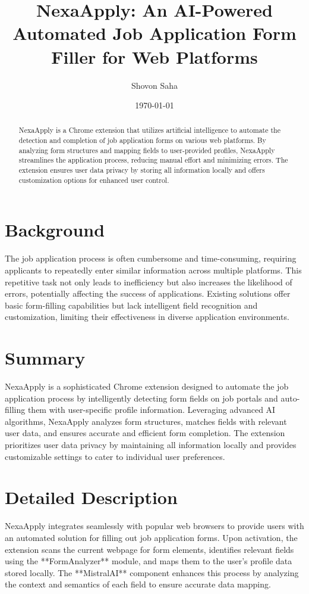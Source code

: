 \documentclass{article}
\title{NexaApply: An AI-Powered Automated Job Application Form Filler for Web Platforms}
\author{Shovon Saha}
\date{\today}
\begin{document}
\maketitle

\begin{abstract}
NexaApply is a Chrome extension that utilizes artificial intelligence to automate the detection and completion of job application forms on various web platforms. By analyzing form structures and mapping fields to user-provided profiles, NexaApply streamlines the application process, reducing manual effort and minimizing errors. The extension ensures user data privacy by storing all information locally and offers customization options for enhanced user control.
\end{abstract}

\section{Background}
The job application process is often cumbersome and time-consuming, requiring applicants to repeatedly enter similar information across multiple platforms. This repetitive task not only leads to inefficiency but also increases the likelihood of errors, potentially affecting the success of applications. Existing solutions offer basic form-filling capabilities but lack intelligent field recognition and customization, limiting their effectiveness in diverse application environments.

\section{Summary}
NexaApply is a sophisticated Chrome extension designed to automate the job application process by intelligently detecting form fields on job portals and auto-filling them with user-specific profile information. Leveraging advanced AI algorithms, NexaApply analyzes form structures, matches fields with relevant user data, and ensures accurate and efficient form completion. The extension prioritizes user data privacy by maintaining all information locally and provides customizable settings to cater to individual user preferences.

\section{Detailed Description}
NexaApply integrates seamlessly with popular web browsers to provide users with an automated solution for filling out job application forms. Upon activation, the extension scans the current webpage for form elements, identifies relevant fields using the **FormAnalyzer** module, and maps them to the user's profile data stored locally. The **MistralAI** component enhances this process by analyzing the context and semantics of each field to ensure accurate data mapping.
\end{document}

